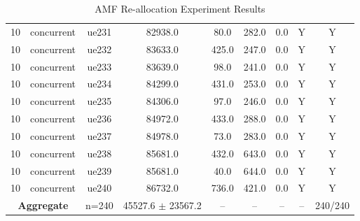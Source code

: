 \begin{table}[ht]
\begin{tabular}{|c|c|c|c|c|c|c|c|c|}
10 & concurrent & ue231 & 82938.0 & 80.0 & 282.0 & 0.0 & Y & Y \\
10 & concurrent & ue232 & 83633.0 & 425.0 & 247.0 & 0.0 & Y & Y \\
10 & concurrent & ue233 & 83639.0 & 98.0 & 241.0 & 0.0 & Y & Y \\
10 & concurrent & ue234 & 84299.0 & 431.0 & 253.0 & 0.0 & Y & Y \\
10 & concurrent & ue235 & 84306.0 & 97.0 & 246.0 & 0.0 & Y & Y \\
10 & concurrent & ue236 & 84972.0 & 433.0 & 288.0 & 0.0 & Y & Y \\
10 & concurrent & ue237 & 84978.0 & 73.0 & 283.0 & 0.0 & Y & Y \\
10 & concurrent & ue238 & 85681.0 & 432.0 & 643.0 & 0.0 & Y & Y \\
10 & concurrent & ue239 & 85681.0 & 40.0 & 644.0 & 0.0 & Y & Y \\
10 & concurrent & ue240 & 86732.0 & 736.0 & 421.0 & 0.0 & Y & Y \\
\multicolumn{2}{|c|}{\textbf{Aggregate}} & n=240 & 45527.6 $\pm$ 23567.2 & -- & -- & -- & -- & 240/240 \\
\hline
\end{tabular}
\caption{AMF Re-allocation Experiment Results}
\label{tab:amf_realloc}
\end{table}
